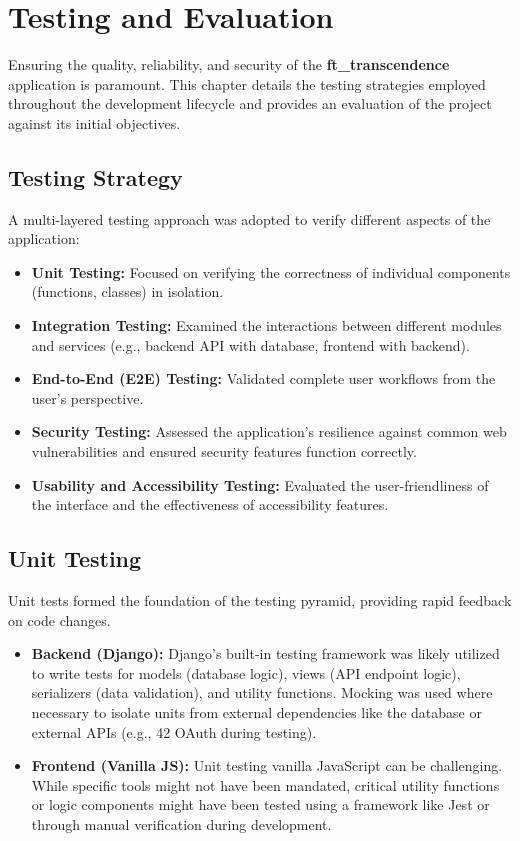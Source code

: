 \chapter{Testing and Evaluation}
\label{ch:testing}

Ensuring the quality, reliability, and security of the \textbf{ft\_transcendence} application is paramount. This chapter details the testing strategies employed throughout the development lifecycle and provides an evaluation of the project against its initial objectives.

\section{Testing Strategy}
\label{sec:testing_strategy}
A multi-layered testing approach was adopted to verify different aspects of the application:
\begin{itemize}
    \item \textbf{Unit Testing:} Focused on verifying the correctness of individual components (functions, classes) in isolation.
    \item \textbf{Integration Testing:} Examined the interactions between different modules and services (e.g., backend API with database, frontend with backend).
    \item \textbf{End-to-End (E2E) Testing:} Validated complete user workflows from the user's perspective.
    \item \textbf{Security Testing:} Assessed the application's resilience against common web vulnerabilities and ensured security features function correctly.
    \item \textbf{Usability and Accessibility Testing:} Evaluated the user-friendliness of the interface and the effectiveness of accessibility features.
\end{itemize}

\section{Unit Testing}
\label{sec:unit_testing}
Unit tests formed the foundation of the testing pyramid, providing rapid feedback on code changes.
\begin{itemize}
    \item \textbf{Backend (Django):} Django's built-in testing framework was likely utilized to write tests for models (database logic), views (API endpoint logic), serializers (data validation), and utility functions. Mocking was used where necessary to isolate units from external dependencies like the database or external APIs (e.g., 42 OAuth during testing).
    \item \textbf{Frontend (Vanilla JS):} Unit testing vanilla JavaScript can be challenging. While specific tools might not have been mandated, critical utility functions or logic components might have been tested using a framework like Jest or through manual verification during development.
\end{itemize}

